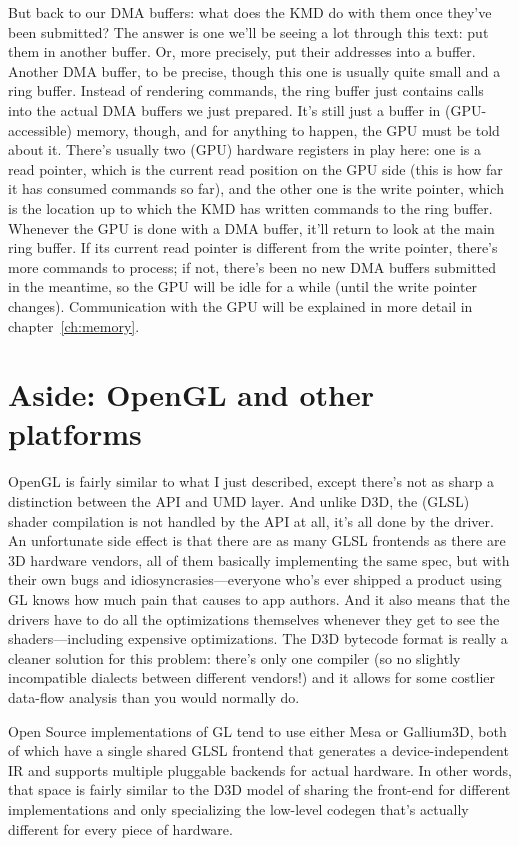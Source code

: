 But back to our DMA buffers: what does the KMD do with them once they've been 
submitted? The answer is one we'll be seeing a lot through this text: put them 
in another buffer. Or, more precisely, put their addresses into a buffer.  
Another DMA buffer, to be precise, though this one is usually quite small and 
a ring buffer. Instead of rendering commands, the ring buffer just contains 
calls into the actual DMA buffers we just prepared. It's still just a buffer in 
(GPU-accessible) memory, though, and for anything to happen, the GPU must be 
told about it. There's usually two (GPU) hardware registers in play here: one 
is a read pointer, which is the current read position on the GPU side (this is 
how far it has consumed commands so far), and the other one is the write 
pointer, which is the location up to which the KMD has written commands to the 
ring buffer. Whenever the GPU is done with a DMA buffer, it'll return to look 
at the main ring buffer. If its current read pointer is different from the 
write pointer, there's more commands to process; if not, there's been no new 
DMA buffers submitted in the meantime, so the GPU will be idle for a while 
(until the write pointer changes). Communication with the GPU will be explained 
in more detail in chapter~\ref{ch:memory}.

\section{Aside: OpenGL and other platforms}

OpenGL is fairly similar to what I just described, except there's not as sharp
a distinction between the API and UMD layer. And unlike D3D, the (GLSL) shader
compilation is not handled by the API at all, it's all done by the driver. An
unfortunate side effect is that there are as many GLSL frontends as there are
3D hardware vendors, all of them basically implementing the same spec, but with
their own bugs and idiosyncrasies---everyone who's ever shipped a product using 
GL knows how much pain that causes to app authors. And it also means that the 
drivers
have to do all the optimizations themselves whenever they get to see the
shaders---including expensive optimizations. The D3D bytecode format is really
a cleaner solution for this problem: there's only one compiler (so no slightly
incompatible dialects between different vendors!) and it allows for some
costlier data-flow analysis than you would normally do.

Open Source implementations of GL tend to use either Mesa or Gallium3D, both of
which have a single shared GLSL frontend that generates a device-independent IR
and supports multiple pluggable backends for actual hardware. In other words,
that space is fairly similar to the D3D model of sharing the front-end for
different implementations and only specializing the low-level codegen that's
actually different for every piece of hardware.

